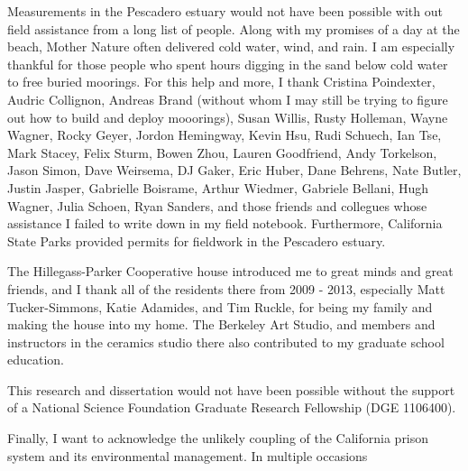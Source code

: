\documentclass{ucbthesis}
\begin{document}
\begin{frontmatter}
\begin{acknowledgements}
Measurements in the Pescadero estuary would not have been possible with out field assistance from a long list of people. Along with my promises of a day at the beach, Mother Nature often delivered cold water, wind, and rain. I am especially thankful for those people who spent hours digging in the sand below cold water to free buried moorings. For this help and more, I thank Cristina Poindexter, Audric Collignon, Andreas Brand (without whom I may still be trying to figure out how to build and deploy mooorings), Susan Willis, Rusty Holleman, Wayne Wagner, Rocky Geyer, Jordon Hemingway, Kevin Hsu, Rudi Schuech, Ian Tse, Mark Stacey, Felix Sturm, Bowen Zhou, Lauren Goodfriend, Andy Torkelson, Jason Simon, Dave Weirsema, DJ Gaker, Eric Huber, Dane Behrens, Nate Butler, Justin Jasper, Gabrielle Boisrame, Arthur Wiedmer, Gabriele Bellani, Hugh Wagner, Julia Schoen, Ryan Sanders, and those friends and collegues whose assistance I failed to write down in my field notebook. Furthermore, California State Parks provided permits for fieldwork in the Pescadero estuary.  

The Hillegass-Parker Cooperative house introduced me to great minds and great friends, and I thank all of the residents there from 2009 - 2013, especially Matt Tucker-Simmons, Katie Adamides, and Tim Ruckle, for being my family and making the house into my home. The Berkeley Art Studio, and members and instructors in the ceramics studio there also contributed to my graduate school education. 

This research and dissertation would not have been possible without the support of a National Science Foundation Graduate Research Fellowship (DGE 1106400).

Finally, I want to acknowledge the unlikely coupling of the California prison system and its environmental management. In multiple occasions

\end{acknowledgements}

\end{frontmatter}


\pagestyle{headings}  %

%















\printbibliography
\end{document}
